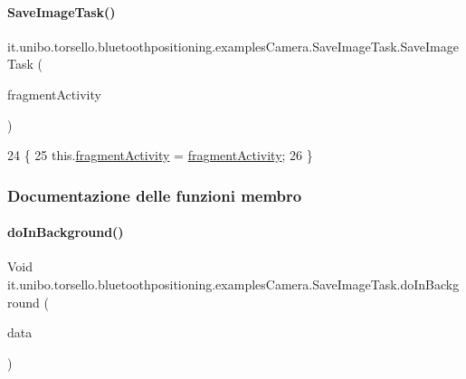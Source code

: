 \paragraph{\texorpdfstring{Save\+Image\+Task()}{SaveImageTask()}}
{\footnotesize\ttfamily it.\+unibo.\+torsello.\+bluetoothpositioning.\+examples\+Camera.\+Save\+Image\+Task.\+Save\+Image\+Task (\begin{DoxyParamCaption}\item[{Fragment\+Activity}]{fragment\+Activity }\end{DoxyParamCaption})}


\begin{DoxyCode}
24                                                             \{
25         this.\hyperlink{classit_1_1unibo_1_1torsello_1_1bluetoothpositioning_1_1examplesCamera_1_1SaveImageTask_a020c67ae36b7f908c900da193d9cd110_a020c67ae36b7f908c900da193d9cd110}{fragmentActivity} = \hyperlink{classit_1_1unibo_1_1torsello_1_1bluetoothpositioning_1_1examplesCamera_1_1SaveImageTask_a020c67ae36b7f908c900da193d9cd110_a020c67ae36b7f908c900da193d9cd110}{fragmentActivity};
26     \}
\end{DoxyCode}


\subsubsection{Documentazione delle funzioni membro}
\hypertarget{classit_1_1unibo_1_1torsello_1_1bluetoothpositioning_1_1examplesCamera_1_1SaveImageTask_ae71e769fead7e2ec11d99922e03a14d9_ae71e769fead7e2ec11d99922e03a14d9}{}\label{classit_1_1unibo_1_1torsello_1_1bluetoothpositioning_1_1examplesCamera_1_1SaveImageTask_ae71e769fead7e2ec11d99922e03a14d9_ae71e769fead7e2ec11d99922e03a14d9} 
\paragraph{\texorpdfstring{do\+In\+Background()}{doInBackground()}}
{\footnotesize\ttfamily Void it.\+unibo.\+torsello.\+bluetoothpositioning.\+examples\+Camera.\+Save\+Image\+Task.\+do\+In\+Background (\begin{DoxyParamCaption}\item[{byte... \mbox{[}$\,$\mbox{]}}]{data }\end{DoxyParamCaption})\hspace{0.3cm}{\ttfamily [protected]}}


